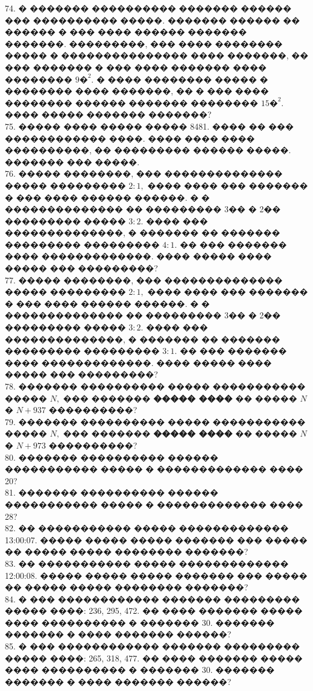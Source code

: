 \documentclass[12pt]{article}
\begin{document}
74. � ������� ���������� ������� ������ ��� ���������� �����. ������� ������ �� ������ � ��� ���� ������ ������� �������. ���������, ��� ���� �������� ����� � ��������������� ���� �������, �� ��� ������� � ��� ���� ������� ���� �������� $9\text{�}^2.$ � ���� �������� ����� � �������� ���� �������, �� � ��� ���� �������� ������ ������� �������� $15\text{�}^2.$ ���� ����� ������� �������?\\
75. ����� ���� ����� ����� 8481. ���� �� ��� ������������ ����. ���� ���� ���� ����������, �� ��������� ������ �����. ������� ��� �����.\\
76. ����� ��������, ��� �������������� ����� ��������� $2:1,$ ���� ���� ��� ������� � ��� ���� ������ ������. � � �������������� �� ��������� 3�� � 2�� ��������� ����� $3:2.$ ���� ��� ��������������, � ������� �� ������� ��������� ��������� $4:1.$ �� ��� ������� ���� �������������. ���� ����� ���� ����� ��� ���������?\\
77. ����� ��������, ��� �������������� ����� ��������� $2:1,$ ���� ���� ��� ������� � ��� ���� ������ ������. � � �������������� �� ��������� 3�� � 2�� ��������� ����� $3:2.$ ���� ��� ��������������, � ������� �� ������� ��������� ��������� $3:1.$ �� ��� ������� ���� �������������. ���� ����� ���� ����� ��� ���������?\\
78. ������� ���������� ����� ����������� ����� $N,$ ��� ������� {\bf ����� ����} �� ����� $N$ � $N+937$ ����������?\\
79. ������� ���������� ����� ����������� ����� $N,$ ��� ������� {\bf ����� ����} �� ����� $N$ � $N+973$ ����������?\\
80. ������� ���������� ������ ����������� ����� � ������������� ���� 20?\\
81. ������� ���������� ������ ����������� ����� � ������������� ���� 28?\\
82. �� ����������� ����� ������������� 13:00:07. ����� ����� ����� ������� ��� ����� �� ����� ����� �������� �������?\\
83. �� ����������� ����� ������������� 12:00:08. ����� ����� ����� ������� ��� ����� �� ����� ����� �������� �������?\\
84. � ��� ������������ ������� ��������� ����� ����: 236, 295, 472. �� ���� ������� ����� ���� ���������� � ������� 30. ������� ������� � ���� ������� ������?\\
85. � ��� ������������ ������� ��������� ����� ����: 265, 318, 477. �� ���� ������� ����� ���� ���������� � ������� 30. ������� ������� � ���� ������� ������?\\
\end{document}
